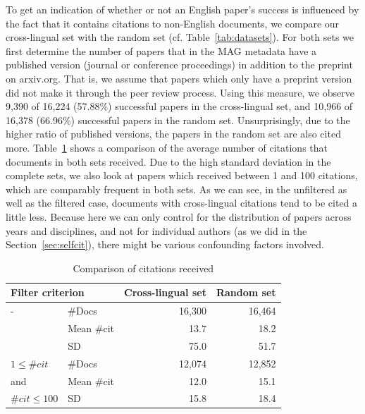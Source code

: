 To get an indication of whether or not an English paper's success is influenced by the fact that it contains citations to non-English documents, we compare our cross-lingual set with the random set (cf. Table~\ref{tab:datasets}). For both sets we first determine the number of papers that in the MAG metadata have a published version (journal or conference proceedings) in addition to the preprint on arxiv.org. That is, we assume that papers which only have a preprint version did not make it through the peer review process. Using this measure, we observe 9,390 of 16,224 (57.88\%) successful papers in the cross-lingual set, and 10,966 of 16,378 (66.96\%) successful papers in the random set. Unsurprisingly, due to the higher ratio of published versions, the papers in the random set are also cited more. Table~\ref{tab:citcounts} shows a comparison of the average number of citations that documents in both sets received. Due to the high standard deviation in the complete sets, we also look at papers which received between 1 and 100 citations, which are comparably frequent in both sets. As we can see, in the unfiltered as well as the filtered case, documents with cross-lingual citations tend to be cited a little less. Because here we can only control for the distribution of papers across years and disciplines, and not for individual authors (as we did in the Section~\ref{sec:selfcit}), there might be various confounding factors involved.


\begin{table}[tb]
\caption{Comparison of citations received}
 \label{tab:citcounts}
  \centering
  \begin{small}
 \begin{threeparttable}
 \begin{tabular}{llrr}
 \toprule
   \multicolumn{2}{l}{Filter criterion} & Cross-lingual set & Random set \\
   \midrule
   - & \#Docs & 16,300 & 16,464 \\
   \ & Mean \#cit & 13.7 & 18.2 \\
   \ & SD & 75.0 & 51.7 \\
   \midrule
   $1\le \#cit$ & \#Docs & 12,074 & 12,852 \\
   and & Mean \#cit & 12.0 & 15.1 \\
   $\#cit\le 100$ & SD & 15.8 & 18.4 \\
   \bottomrule
 \end{tabular}
\end{threeparttable}
  \end{small}
\end{table}

